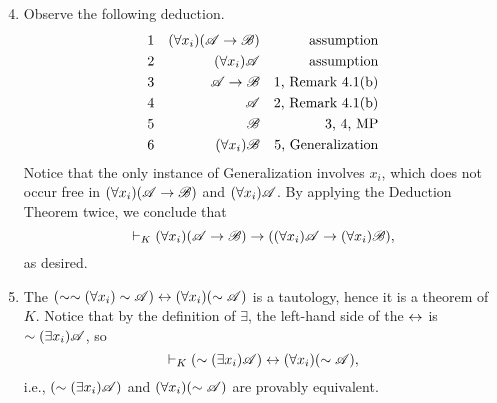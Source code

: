 \solutions{}
\begin{enumerate}
  \setcounter{enumi}{3}
  \item %
    Observe the following deduction.
      \begin{align*}
        \text{1}&&
        (\forall x_i)(\mathscr{A} \rightarrow \mathscr{B})&&
        \text{assumption}\\
        \text{2}&&
        (\forall x_i)\mathscr{A}&&
        \text{assumption}\\
        \text{3}&&
        \mathscr{A} \rightarrow \mathscr{B}&&
        \text{1, Remark 4.1(b)}\\
        \text{4}&&
        \mathscr{A}&&
        \text{2, Remark 4.1(b)}\\
        \text{5}&&
        \mathscr{B}&&
        \text{3, 4, MP}\\
        \text{6}&&
        (\forall x_i)\mathscr{B}&&
        \text{5, Generalization}
      \end{align*}
    Notice that the only instance of Generalization involves \(x_i\), which does not occur free in \((\forall x_i)(\mathscr{A} \rightarrow \mathscr{B})\) and \((\forall x_i)\mathscr{A}\). By applying the Deduction Theorem twice, we conclude that
      \[\vdash_{K} (\forall x_i)(\mathscr{A} \rightarrow \mathscr{B}) \rightarrow ((\forall x_i)\mathscr{A} \rightarrow (\forall x_i)\mathscr{B}),\]
    as desired.

  \item %
      The \wf{} \((\sim\sim(\forall x_i)\sim\mathscr{A}) \leftrightarrow (\forall x_i)(\sim\mathscr{A})\) is a tautology, hence it is a theorem of \(K\). Notice that by the definition of \(\exists\), the left-hand side of the \(\leftrightarrow\) is \(\sim(\exists x_i)\mathscr{A}\), so
        \[\vdash_{K} (\sim(\exists x_i)\mathscr{A}) \leftrightarrow (\forall x_i)(\sim\mathscr{A}),\]
        i.e., \((\sim(\exists x_i)\mathscr{A})\) and \((\forall x_i)(\sim\mathscr{A})\) are provably equivalent.


\end{enumerate}

